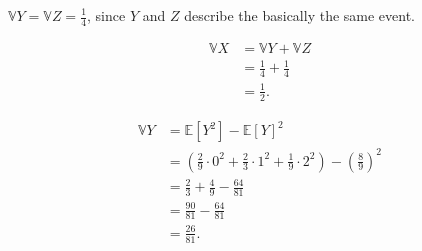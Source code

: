 \documentclass[12pt]{article}
\begin{document}
    \medskip
    $\mathbb VY = \mathbb VZ = \frac14$, since $Y$ and $Z$ describe the basically the same event.
    
    \medskip
    \begin{align*}
        \mathbb VX &= \mathbb VY + \mathbb VZ \\
                   &= \frac14 + \frac14 \\
                   &= \frac12.
    \end{align*}
    
\newpage
{}
\begin{align*}
    \mathbb VY &= \mathbb E[Y^2] - \mathbb E[Y]^2 \\
               &= (\frac29 \cdot 0^2 + \frac23 \cdot 1^2 + \frac19 \cdot 2^2) - (\frac{8}{9})^2 \\
               &= \frac23 + \frac49 - \frac{64}{81} \\
               &= \frac{90}{81} - \frac{64}{81} \\
               &= \frac{26}{81}.
\end{align*}
\end{document}
